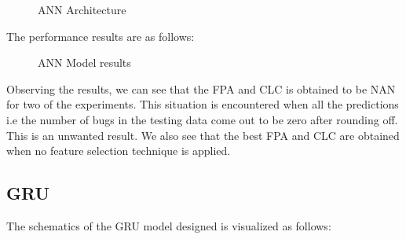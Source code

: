 \begin{figure}
%
  \caption{ANN Architecture}
  \label{fig:key}
\end{figure}
 
 The performance results are as follows:
 
 \begin{figure}
%
  \caption{ANN Model results}
  \label{fig:key}
\end{figure}
 
Observing the results, we can see that the FPA and CLC is obtained to be NAN for two of the experiments. This situation is encountered when all the predictions i.e the number of bugs in the testing data come out to be zero after rounding off. This is an unwanted result. We also see that the best FPA and CLC are obtained when no feature selection technique is applied.

\subsection{GRU}
The schematics of the GRU model designed is visualized as follows:

